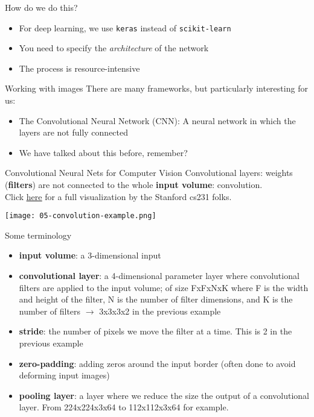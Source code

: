 \begin{frame}{How do we do this?}
  \begin{itemize}
  \item For deep learning, we use \texttt{keras} instead of \texttt{scikit-learn}
  \item You need to specify the \emph{architecture} of the network
  \item The process is resource-intensive
  \end{itemize}
\end{frame}


\begin{frame}{Working with images}
  There are many frameworks, but particularly interesting for us:
  \begin{itemize}
  \item The Convolutional Neural Network (CNN): A neural network in which the layers are not fully connected
  \item We have talked about this before, remember?
  \end{itemize}
\end{frame}

\begin{frame}{Convolutional Neural Nets for Computer Vision}
  \noindent Convolutional layers: weights (\textbf{filters}) are not connected to the whole \textbf{input volume}: convolution.\\ \footnotesize Click \href{http://cs231n.github.io/convolutional-networks/}{\underline{here}} for a full visualization by the Stanford cs231 folks.
  
  \begin{center}
  \texttt{[image: 05-convolution-example.png]} 
  \end{center}
  
  
  \end{frame}

  \begin{frame}{Some terminology}
    \begin{itemize}[<+->]
      \setlength\itemsep{0.2cm}
      \item \textbf{input volume}: a 3-dimensional input
      \item \textbf{convolutional layer}: a 4-dimensional parameter layer where convolutional filters are applied to the input volume; of size FxFxNxK where F is the width and height of the filter, N is the number of filter dimensions, and K is the number of filters $\rightarrow$ 3x3x3x2 in the previous example
      \item \textbf{stride}: the number of pixels we move the filter at a time. This is 2 in the previous example
      \item \textbf{zero-padding}: adding zeros around the input border (often done to avoid deforming input images)
      \item \textbf{pooling layer}: a layer where we reduce the size the output of a convolutional layer. From 224x224x3x64 to 112x112x3x64 for example.
      \end{itemize}
  \end{frame}


